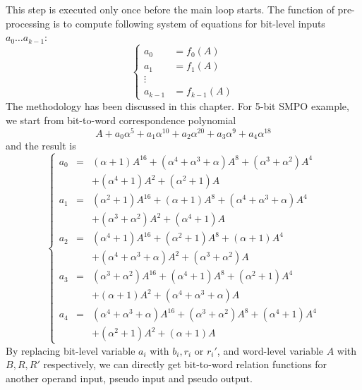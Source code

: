 This step is executed only once before the main loop starts. The function of pre-processing is to compute following system
of equations for bit-level inputs $a_0 \dots a_{k-1}$:
\begin{displaymath}
\left\{
  \begin{array}{ll}
  a_0 & = f_0(A)\\
  a_1 & = f_1(A)\\
  \vdots & \ \\
  a_{k-1} & = f_{k-1}(A)
  \end{array} \right.
\end{displaymath}
The methodology has been discussed in this chapter. For 5-bit SMPO example, we start from bit-to-word correspondence polynomial
\begin{displaymath}
A + a_0\alpha^5+a_1\alpha^{10}+a_2\alpha^{20}+a_3\alpha^9+a_4\alpha^{18}
\end{displaymath}
and the result is
\begin{displaymath}
\left\{
  \begin{array}{lcl}
  a_0 & = & (\alpha+1)A^{16}+(\alpha^4+\alpha^3+\alpha)A^8+(\alpha^3+\alpha^2)A^4\\&&+(\alpha^4+1)A^2+(\alpha^2+1)A\\
  a_1 & = & (\alpha^2+1)A^{16}+(\alpha+1)A^8+(\alpha^4+\alpha^3+\alpha)A^4\\&&+(\alpha^3+\alpha^2)A^2+(\alpha^4+1)A\\
  a_2 & = & (\alpha^4+1)A^{16}+(\alpha^2+1)A^8+(\alpha+1)A^4\\&&+(\alpha^4+\alpha^3+\alpha)A^2+(\alpha^3+\alpha^2)A\\
  a_3 & = & (\alpha^3+\alpha^2)A^{16}+(\alpha^4+1)A^8+(\alpha^2+1)A^4\\&&+(\alpha+1)A^2+(\alpha^4+\alpha^3+\alpha)A\\
  a_4 & = & (\alpha^4+\alpha^3+\alpha)A^{16}+(\alpha^3+\alpha^2)A^8+(\alpha^4+1)A^4\\&&+(\alpha^2+1)A^2+(\alpha+1)A
  \end{array} \right.
\end{displaymath}
By replacing bit-level variable $a_i$ with $b_i, r_i$ or $r_i'$, and word-level variable $A$ with $B, R, R'$ respectively,
we can directly get bit-to-word relation functions for another operand input, pseudo input and pseudo output.

